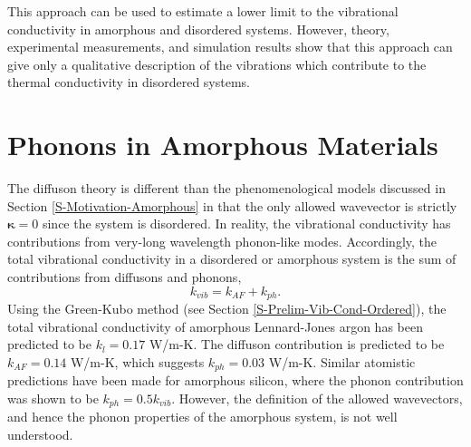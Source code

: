 \documentclass[aps,prb,preprint,superscriptaddress,amsmath,amssymb,floatfix]{revtex4}
\begin{document}
This approach can be used to estimate a lower limit to the vibrational 
conductivity in amorphous and disordered systems.
\cite{cahill_lower_1992,cahill_thermal_1987} 
However, theory,\cite{allen_thermal_1993} experimental measurements,
\cite{graebner_phonon_1986} and simulation results
\cite{shenogin_predicting_2009} show that this approach can give only a 
qualitative description of the vibrations which contribute to the thermal 
conductivity in disordered systems.



\section{\label{S-Prelim-Phonons-Amor}Phonons in Amorphous Materials }
The diffuson theory is different than the phenomenological models 
discussed in Section \ref{S-Motivation-Amorphous} in that the only 
allowed wavevector is strictly $\mathbf{\kappa}= 0$ since the system is 
disordered. In reality, the vibrational conductivity has contributions 
from very-long wavelength phonon-like modes. Accordingly, the total 
vibrational conductivity in a disordered or amorphous system is the sum of 
contributions from diffusons and phonons,
\begin{equation}\label{EQ:M:k_thermal}
k_{vib} = k_{AF} + k_{ph}.
\end{equation}
Using the Green-Kubo method (see Section \ref{S-Prelim-Vib-Cond-Ordered}), 
the total vibrational conductivity of amorphous Lennard-Jones argon has 
been predicted to be $k_{l}=0.17$ W/m-K. The diffuson contribution is 
predicted to be $k_{AF} = 0.14$ W/m-K, which suggests 
$k_{ph} = 0.03$ W/m-K. Similar atomistic predictions have been made for 
amorphous silicon, where the phonon contribution was shown to be 
$k_{ph} = 0.5k_{vib}$.\cite{He2011a} However, the definition of the 
allowed wavevectors, and hence the phonon properties of the amorphous 
system, is not well understood.\cite{He2011a}


\end{document}
